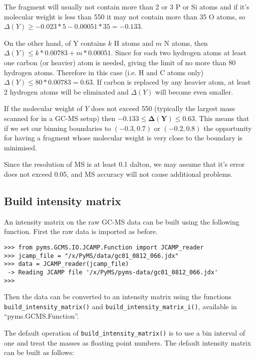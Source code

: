 The fragment will usually not contain more than 2 or 3 P or Si atoms and if it's 
molecular weight is less than 550 it may not contain more than 35 O atoms, so 
$\Delta(Y) \geq -0.023*5 - 0.00051*35 = -0.133$.

On the other hand, of Y contains $k$ H atoms and $m$ N atoms, then $\Delta(Y)
\leq k*0.00783 + m*0.00051$. Since for each two hydrogen atoms at least one
carbon (or heavier) atom is needed, giving the limit of no more than 80 hydrogen
atoms. Therefore in this case (i.e. H and C atoms only)$\Delta(Y) \leq 80*0.00783
= 0.63$. If carbon is replaced by any heavier atom, at least 2 hydrogen atoms
will be eliminated and $\Delta(Y)$ will become even smaller.

If the molecular weight of $Y$ does not exceed 550 (typically the largest mass
scanned for in a GC-MS setup) then $\mathbf{-0.133 \leq \Delta(Y) \leq 0.63}$.
This means that if we set our binning boundaries to $(-0.3, 0.7)$ or $(-0.2, 0.8)$
the opportunity for having a fragment whose molecular weight is very close to
the boundary is minimised.

Since the resolution of MS is at least 0.1 dalton, we may assume that it's error
does not exceed 0.05, and MS accuracy will not cause additional problems.

\subsection{Build intensity matrix}


An intensity matrix on the raw GC-MS data can be built using the following
function. First the raw data is imported as before.

\begin{verbatim}
>>> from pyms.GCMS.IO.JCAMP.Function import JCAMP_reader
>>> jcamp_file = "/x/PyMS/data/gc01_0812_066.jdx"
>>> data = JCAMP_reader(jcamp_file)
 -> Reading JCAMP file '/x/PyMS/pyms-data/gc01_0812_066.jdx'
>>>
\end{verbatim}

\noindent
Then the data can be converted to an intensity matrix using the functions
{\tt build\_intensity\_matrix()} and {\tt build\_intensity\_matrix\_i()},
available in ``pyms.GCMS.Function''.

The default operation of {\tt build\_intensity\_matrix()} is to use a bin
interval of one and treat the masses as floating point numbers. The default
intensity matrix can be built as follows:

